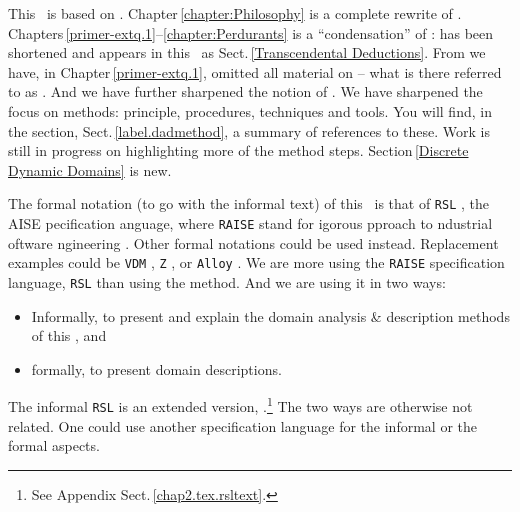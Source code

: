 
\begynd
\pind This \primer\ is based on \cite[Nov.\,2021]{BjornerMonograph2020}.
\pind Chapter\,\ref{chapter:Philosophy} is a complete rewrite of
      \cite[Chapter\,2]{BjornerMonograph2020}.  
\pind Chapters\,\ref{primer-extq.1}--\ref{chapter:Perdurants} is a
      ``condensation'' of \cite[Chapters\,4--7]{BjornerMonograph2020}:
\begynd
\pind \cite[Chapter\,6]{BjornerMonograph2020} has been shortened and
      appears in this \primer\ as Sect.\,\ref{Transcendental Deductions}.
\pind From \cite[Chapter\,4]{BjornerMonograph2020} we have, in
      Chapter\,\ref{primer-extq.1}, omitted all 
      material on -- what is there referred to as .
\pind And we have further sharpened the notion of .
\afslut
\pind We have sharpened the focus on methods: principle, procedures,
      techniques and tools.
\begynd
\pind You will find, in the  section,
      Sect.\,\vref{label.dadmethod}, a summary of references to these.
\pind Work is still in progress on highlighting more of the method steps.
\afslut
\pind Section\,\ref{Discrete Dynamic Domains} is new. 
\afslut

\label{RSL-I}

\begynd
\pind The formal notation (to go with the informal text) of this
      \primer\ is that of \texttt{RSL} \cite{RSL}, the AISE
      pecification anguage, where \texttt{RAISE}
      stand
      for igorous pproach to ndustrial
      oftware ngineering \cite{RaiseMethod}. 
\pind Other formal notations could be used instead.
\pind Replacement examples could be \texttt{VDM} \citevdm , \texttt{Z}
      \citez, or \texttt{Alloy} \citealloy.
\pind We are more using the \texttt{RAISE} specification language,
      \texttt{RSL} than using the method.
\pind And we are using it in two ways:
\begin{itemize}
\item Informally, to present and explain the domain analysis \&
      description methods of this \primer, and
\item formally, to present domain descriptions. 
\end{itemize}
\pind The informal \texttt{RSL} is an extended version,
\rslplus.\footnote{See Appendix Sect.\,\vref{chap2.tex.rsltext}.}
\pind The two ways are otherwise not related.
\pind One could use another specification language  for the
      informal or  the formal aspects.
\afslut

